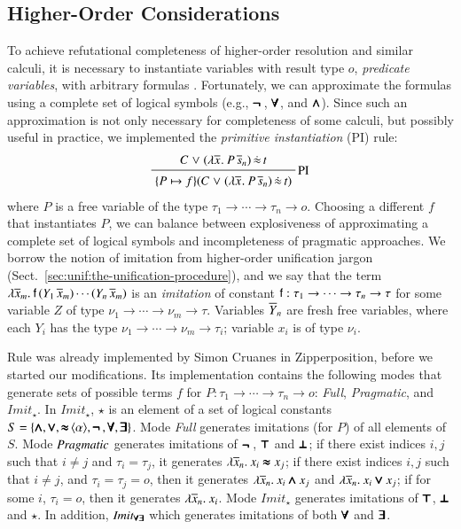 \subsection{Higher-Order Considerations}
\label{subsect:bool:core}
To achieve refutational completeness of higher-order resolution and similar
calculi, it is necessary to instantiate variables with result type $o$,
\emph{predicate variables}, with arbitrary formulas
\cite{as-18-phd,pa-01-classical-ty-thy}. Fortunately, we can approximate the
formulas using a complete set of logical symbols (e.g., $\pmb{\neg\,}$, $\pmb{\forall}$, and
$\pmb{\land}$). Since such an approximation is not only necessary for completeness of
some calculi, but possibly useful in practice, we implemented the \emph{primitive
instantiation} (PI) rule:
%
$$ \namedinference{PI} {C \llor (\lam{\tuple{x}{}}{P \, \tuplen{s}}) \, \dot{\eq}
\, t} {\substcl{\{ P
\mapsto f \}}{C \llor (\lam{\tuple{x}{}}{P \, \tuplen{s}}) \, \dot{\eq} \, t}  } $$
%
where $P$ is a free variable of
the type $\tau_1 \rightarrow \cdots \rightarrow \tau_n \rightarrow o$. 
Choosing a different $f$ that instantiates $P$, we can balance between
explosiveness of approximating a complete set of logical symbols and
incompleteness of pragmatic approaches. We borrow the notion of imitation from
higher-order unification jargon (Sect.~\ref{sec:unif:the-unification-procedure}), and we say
that the term $\lambda \overline{x}_{m}.\> \mathsf{f} \, (Y_1 \, \overline{x}_{m}) \cdots (Y_n
\, \overline{x}_{m}) $ is an \emph{imitation} of constant $\mathsf{f} : \tau_1
\rightarrow \cdots \rightarrow \tau_n \rightarrow \tau$ for some variable $Z$ of type $\nu_1
\rightarrow \cdots \rightarrow \nu_m \rightarrow \tau$. Variables $\overline{Y}_{n}$
are fresh free variables, where each $Y_i$ has the type $\nu_1 \rightarrow
\cdots \rightarrow \nu_m \rightarrow \tau_i$; variable $x_i$ is of type $\nu_i$.
\pagebreak[2]

Rule  was already implemented by Simon Cruanes in Zipperposition,
before we started our modifications. Its implementation contains the following modes that generate
sets of possible terms $f$ for $P: \tau_1 \rightarrow \cdots \rightarrow \tau_n
\rightarrow o$: \emph{Full}, \emph{Pragmatic}, and $\mathit{Imit}_{\star}$. In  $\mathit{Imit}_{\star}$,
$\star$ is an element of a set of logical constants $S = \{ \pmb{\land}, \pmb{\lor},
\mathop{\pmb{\approx}}{\langle\alpha\rangle}, \pmb{\neg\,}, \pmb{\forall}, \pmb{\exists} \}$. Mode \emph{Full}
generates imitations (for $P$) of all elements of $S$. Mode $\emph{Pragmatic}$
generates imitations of $\pmb{\neg\,}$, $\pmb{\top}$ and $\pmb{\bot}$; if there exist indices $i,j$
such that $i\not= j$ and  $\tau_i = \tau_j$, it generates $\lambda \overline{x}_{n}.\> x_i
\pmb{\approx} x_j$; if there exist indices $i,j$ such that $i \not= j$, and $\tau_i =
\tau_j = o$, then it generates $\lambda \overline{x}_{n}.\> x_i \pmb{\land} x_j$ and
$\lambda \overline{x}_{n}.\> x_i \pmb{\lor} x_j$; if for some $i$, $\tau_i = o$, then it
generates $\lambda \overline{x}_{n}.\> x_i$. Mode $\mathit{Imit}_\star$ generates
imitations of $\pmb{\top}$, $\pmb{\bot}$ and $\star$. In addition, $\mathit{Imit_{\pmb{\forall}\pmb{\exists}}}$ which generates imitations
of both $\pmb{\forall}$ and $\pmb{\exists}$.

